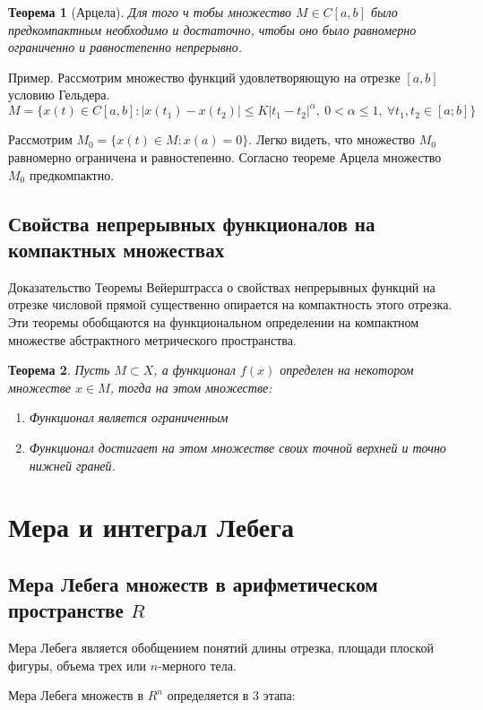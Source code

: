 \documentclass[14pt,a4paper]{extarticle}
\newtheorem{theorem}{Теорема}[section]
\theoremstyle{definition}
\theoremstyle{remark}
\renewcommand{\[}{\begin{dmath*}[compact]}
\renewcommand{\]}{\end{dmath*}}
\newcommand{\be}{\begin{enumerate}}
\newcommand{\ee}{\end{enumerate}}
\newcommand{\sep}{ , \ \allowbreak }
\begin{document}
\begin{theorem}[Арцела]
  Для того ч тобы множество $M\in C[a,b]$ было предкомпактным
  необходимо и достаточно, чтобы оно было равномерно ограниченно
  и равностепенно непрерывно.
\end{theorem}

Пример. Рассмотрим множество функций удовлетворяющую на отрезке $[a,b]$
условию Гельдера.
\[ M=\{x(t)\in C[a,b]: |x(t_1)-x(t_2)|\leq K|t_1-t_2|^\alpha \sep
0 < \alpha \leq 1 \sep \forall t_1,t_2 \in [a;b]\}\]

Рассмотрим $M_0=\{x(t)\in M:x(a)=0\}$.
Легко видеть, что множество $M_0$ равномерно ограничена и равностепенно.
Согласно теореме Арцела множество $M_0$ предкомпактно.

\subsection{Свойства непрерывных функционалов на компактных множествах}

Доказательство Теоремы Вейерштрасса о свойствах непрерывных функций
на отрезке числовой прямой существенно опирается на компактность этого отрезка.
Эти теоремы обобщаются на функциональном определении на компактном
множестве абстрактного метрического пространства.

\begin{theorem}
  Пусть $M\subset X$, а функционал $f(x)$ определен на некотором множестве
  $x \in M$, тогда на этом множестве:
  \be
    \item Функционал является ограниченным
    \item Функционал достигает на этом множестве своих
    точной верхней и точно нижней граней.
  \ee
\end{theorem}

\section{Мера и интеграл Лебега}

\subsection{Мера Лебега множеств в арифметическом пространстве
\texorpdfstring{$R$}{Lg}}

Мера Лебега является обобщением понятий длины отрезка, площади плоской фигуры,
объема трех или $n$-мерного тела.

Мера Лебега множеств в $R^n$ определяется в 3 этапа:
\end{document}
